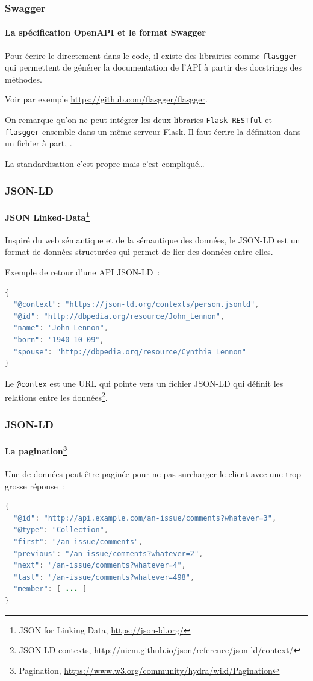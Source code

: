 \documentclass{beamer}
\begin{document}
    \begin{frame}[fragile]
        \transdissolve
        \frametitle{Swagger}
        \framesubtitle{La spécification OpenAPI et le format Swagger}
        Pour écrire le  directement dans le code, il existe des librairies comme \lstinline{flasgger} qui permettent de générer la documentation de l'API à partir des docstrings des méthodes.

        Voir par exemple \url{https://github.com/flasgger/flasgger}.
        \begin{dangercolorbox}
            On remarque qu'on ne peut intégrer les deux libraries \lstinline{Flask-RESTful} et \lstinline{flasgger} ensemble dans un même serveur Flask.
            Il faut écrire la définition dans un fichier  à part, .

            La standardisation c'est propre mais c'est compliqué\ldots
        \end{dangercolorbox}
    \end{frame}

    \begin{frame}[fragile]
        \transdissolve
        \frametitle{JSON-LD}
        \framesubtitle{JSON Linked-Data\footnote{JSON for Linking Data, \url{https://json-ld.org/}}}
        Inspiré du web sémantique et de la sémantique des données, le JSON-LD est un format de données structurées qui permet de lier des données entre elles.

        \bigbreak
        Exemple de retour d'une API JSON-LD~:
        \begin{lstlisting}[language=java,basicstyle=\ttfamily\tiny]
{
  "@context": "https://json-ld.org/contexts/person.jsonld",
  "@id": "http://dbpedia.org/resource/John_Lennon",
  "name": "John Lennon",
  "born": "1940-10-09",
  "spouse": "http://dbpedia.org/resource/Cynthia_Lennon"
}
        \end{lstlisting}
        Le \lstinline{@contex} est une URL qui pointe vers un fichier JSON-LD qui définit les relations entre les données\footnote{JSON-LD contexts, \url{http://niem.github.io/json/reference/json-ld/context/}}.
    \end{frame}

    \begin{frame}[fragile]
        \transdissolve
        \frametitle{JSON-LD}
        \framesubtitle{La pagination\footnote{Pagination, \url{https://www.w3.org/community/hydra/wiki/Pagination}}}
        Une  de données peut être paginée pour ne pas surcharger le client avec une trop grosse réponse~:
        \begin{lstlisting}[language=java]
{
  "@id": "http://api.example.com/an-issue/comments?whatever=3",
  "@type": "Collection",
  "first": "/an-issue/comments",
  "previous": "/an-issue/comments?whatever=2",
  "next": "/an-issue/comments?whatever=4",
  "last": "/an-issue/comments?whatever=498",
  "member": [ ... ]
}
        \end{lstlisting}
    \end{frame}
\end{document}
